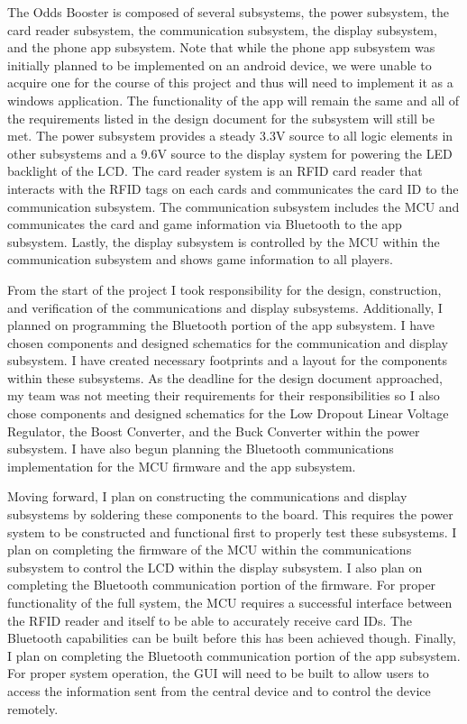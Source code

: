 \documentclass[12pt]{article}
\begin{document}
The Odds Booster is composed of several subsystems, the power subsystem, the card reader subsystem, the communication subsystem, the display subsystem, and the phone app subsystem. Note that while the phone app subsystem was initially planned to be implemented on an android device, we were unable to acquire one for the course of this project and thus will need to implement it as a windows application. The functionality of the app will remain the same and all of the requirements listed in the design document for the subsystem will still be met. The power subsystem provides a steady 3.3V source to all logic elements in other subsystems and a 9.6V source to the display system for powering the LED backlight of the LCD. The card reader system is an RFID card reader that interacts with the RFID tags on each cards and communicates the card ID to the communication subsystem. The communication subsystem includes the MCU and communicates the card and game information via Bluetooth to the app subsystem. Lastly, the display subsystem is controlled by the MCU within the communication subsystem and shows game information to all players. 

From the start of the project I took responsibility for the design, construction, and verification of the communications and display subsystems. Additionally, I planned on programming the Bluetooth portion of the app subsystem. I have chosen components and designed schematics for the communication and display subsystem. I have created necessary footprints and a layout for the components within these subsystems. As the deadline for the design document approached, my team was not meeting their requirements for their responsibilities so I also chose components and designed schematics for the Low Dropout Linear Voltage Regulator, the Boost Converter, and the Buck Converter within the power subsystem. I have also begun planning the Bluetooth communications implementation for the MCU firmware and the app subsystem.

Moving forward, I plan on constructing the communications and display subsystems by soldering these components to the board. This requires the power system to be constructed and functional first to properly test these subsystems. I plan on completing the firmware of the MCU within the communications subsystem to control the LCD within the display subsystem. I also plan on completing the Bluetooth communication portion of the firmware. For proper functionality of the full system, the MCU requires a successful interface between the RFID reader and itself to be able to accurately receive card IDs. The Bluetooth capabilities can be built before this has been achieved though. Finally, I plan on completing the Bluetooth communication portion of the app subsystem. For proper system operation, the GUI will need to be built to allow users to access the information sent from the central device and to control the device remotely.
\end{document}
